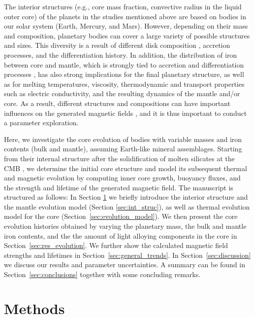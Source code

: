 \documentclass[draft]{agujournal2019} %
\newcommand{\lena}[1]{\textcolor{blue}{\textit{(Lena: #1)}}}
\begin{document}
The interior structures (e.g., core mass fraction, convective radius in the liquid outer core) of the planets in the studies mentioned above are based on bodies in our solar system (Earth, Mercury, and Mars). However, depending on their mass and composition, planetary bodies can cover a large variety of possible structures and sizes. This diversity is a result of different disk composition \cite{bond2010compositional,moriarty2014chemistry}, accretion processes, and the differentiation history. 
In addition, the distribution of iron between core and mantle, which is strongly tied to accretion and differentiation processes \cite{elkins2008coreless,wohlers2017uranium}, has also strong implications for the final planetary structure, as well as for melting temperatures, viscosity, thermodynamic and transport properties such as electric conductivity, and the resulting dynamics of the mantle and/or core. As a result, different structures and compositions can have important influences on the generated magnetic fields \cite{driscoll_optimal_2011}, and it is thus important to conduct a parameter exploration.  

Here, we investigate the core evolution of bodies with variable masses and iron contents (bulk and mantle), assuming Earth-like mineral assemblages. Starting from their internal structure after the solidification of molten silicates at the CMB \cite{stixrude2014melting,noacklasbleis_2020}, we determine the initial core structure and model its subsequent thermal and magnetic evolution by computing inner core growth, buoyancy fluxes, and the strength and lifetime of the generated magnetic field. The manuscript is structured as follows: In Section \ref{sec:methods} we briefly introduce the interior structure and the mantle evolution model (Section \ref{sec:int_struc}), as well as thermal evolution model for the core (Section~\ref{sec:evolution_model}). We then present the core evolution histories obtained by varying the planetary mass, the bulk and mantle iron contents, and the the amount of light alloying components in the core in Section~\ref{sec:res_evolution}. We further show the calculated magnetic field strengths and lifetimes in Section~\ref{sec:general_trends}. In Section~\ref{sec:discussion} we discuss our results and parameter uncertainties. A summary can be found in Section~\ref{sec:conclusions} together with some concluding remarks.

\section{Methods}\label{sec:methods}
\end{document}
